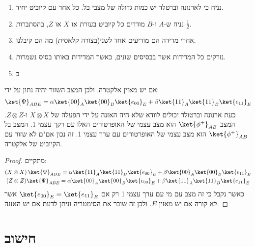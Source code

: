 \documentclass{tstextbook}
\begin{document}
\begin{proposition}
  \begin{enumerate}
    \item נניח כי לארנונה וברטלד יש כמות גדולה של מצבי בל. כל אחד עם קיוביט יחיד. 


    \item נניח ש-\(A\) ו-\(B\) מודדים כל קיוביט בעזרת או \(X\) או \(Z\), בהסתברות \(\frac{1}{2}\).  


    \item אחרי מדידה הם מודיעים אחד לשני(בצורה קלאסית) מה הם קיבלנו. 


    \item נזרקים כל המדידות אשר בבסיסים שונים, כאשר המדידות באותו בסיס נשמרות. 


    \item ב 


  \end{enumerate}
\end{proposition}
\begin{proposition}
אם יש מאזין אלקטרה. ולכן המצב השזור יהיה נתון על ידי:
$$\ket{\Psi}_{ABE} = \alpha\ket{00}_{A}\ket{00}_{B}\ket{e_{00}}_{E}+\beta\ket{11}_{A}\ket{11}_{B}\ket{e_{11}}_{E}$$
כעת ארנונה וברטולד יכולים לוודא שלא היה האזנה על ידי הפעלה של \(X\otimes X\) ו-\(Z \otimes Z\). המצב \(\ket{\phi^{+}}_{AB}\) הוא מצב עצמי של האופרטורים האלו עם רקך עצמי 1.  המצב בל \(\ket{\phi^{+}}_{AB}\) הוא מצב עצמי של האופרטורים עם ערך עצמי 1. זה נכון אם"ם לא שזור עם הקיוביט של אלקטרה.

\end{proposition}
\begin{proof}
מתקיים:
\begin{gather*}\left( X \otimes X \right) \ket{\Psi}_{ABE} = \alpha\ket{11}_{A}\ket{11}_{B}\ket{e_{00}}_{E}+\beta\ket{00}_{A}\ket{00}_{B}\ket{e_{11}}_{E}  \\(Z \otimes Z) \ket{\Psi}_{ABE} = \alpha\ket{00}_{A}\ket{00}_{B}\ket{e_{00}}_{E}+\beta\ket{11}_{A}\ket{11}_{B}\ket{e_{11}}_{E}
\end{gather*}
כאשר נקבל כי זה מצב עם מי עם ערך עצמי 1 רק אם \(\ket{e_{00}}_E = \ket{e_{11}}_E\) אשר לא קורה אם יש מאזין \(E\). ולכן זה שובר את הסימטריה וניתן לדעת אם יש האזנה.

\end{proof}

\section{חישוב}
\end{document}
